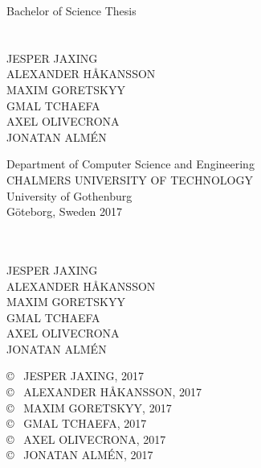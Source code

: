 \newpage
\restoregeometry
\thispagestyle{empty}
\mbox{}

\newpage
\setcounter{page}{1}
\thispagestyle{empty}
\begin{center}
	\large Bachelor of Science Thesis\\[4cm]		%
	\textbf{\large \varthetitle} \\[0.7cm]
	{\large \varthesubtitle}\\[1cm]
	{\large JESPER JAXING}\\
	{\large ALEXANDER HÅKANSSON} \\
	{\large MAXIM GORETSKYY} \\
	{\large GMAL TCHAEFA } \\
	{\large AXEL OLIVECRONA} \\
	{\large JONATAN ALMÉN} \
	
	\vfill	
	\begin{figure}[H]
	\centering
	\end{figure}	\vspace{5mm}	
	
	Department of Computer Science and Engineering \\
	CHALMERS UNIVERSITY OF TECHNOLOGY \\
	University of Gothenburg \\[0.5cm]
	Göteborg, Sweden 2017 \\
\end{center}


\newpage
\thispagestyle{plain}
\textbf{\varthetitle}\\
\varthesubtitle
\vspace*{0.5cm}\\
JESPER JAXING\\
ALEXANDER HÅKANSSON\\
MAXIM GORETSKYY\\
GMAL TCHAEFA\\
AXEL OLIVECRONA\\
JONATAN ALMÉN\setlength{\parskip}{0.7cm}

\copyright ~ JESPER JAXING, 2017\\
\copyright ~ ALEXANDER HÅKANSSON, 2017\\
\copyright ~ MAXIM GORETSKYY, 2017\\
\copyright ~ GMAL TCHAEFA, 2017\\
\copyright ~ AXEL OLIVECRONA, 2017\\
\copyright ~ JONATAN ALMÉN, 2017 \setlength{\parskip}{0.5cm}

